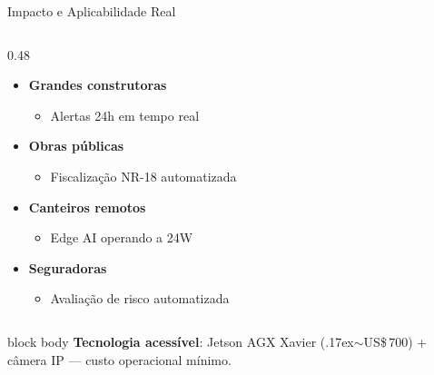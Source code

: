 \begin{frame}{Impacto e Aplicabilidade Real}
\begin{columns}[c]
\begin{column}{0.48\textwidth}
      \begin{itemize}\setlength{\itemsep}{0.5mm}\footnotesize
        \item \textbf{Grandes construtoras}
          \begin{itemize}\setlength{\itemsep}{0pt}\scriptsize
            \item Alertas 24h em tempo real
          \end{itemize}
        \item \textbf{Obras públicas}
          \begin{itemize}\setlength{\itemsep}{0pt}\scriptsize
            \item Fiscalização NR-18 automatizada
          \end{itemize}
        \item \textbf{Canteiros remotos}
          \begin{itemize}\setlength{\itemsep}{0pt}\scriptsize
            \item Edge AI operando a 24W
          \end{itemize}
        \item \textbf{Seguradoras}
          \begin{itemize}\setlength{\itemsep}{0pt}\scriptsize
            \item Avaliação de risco automatizada
          \end{itemize}
      \end{itemize}
    \end{column}
  \end{columns}

  \vspace{2mm}

  \begin{beamercolorbox}[wd=\textwidth, rounded=true, shadow=false]{block body}
    \centering
    {\footnotesize\color{stagecolor}%
      \textbf{Tecnologia acessível}: Jetson AGX Xavier ({\raise.17ex\hbox{$\scriptstyle\sim$}}US\$\,700) + câmera IP --- custo operacional mínimo.}
  \end{beamercolorbox}
  \vfill
\end{frame}

